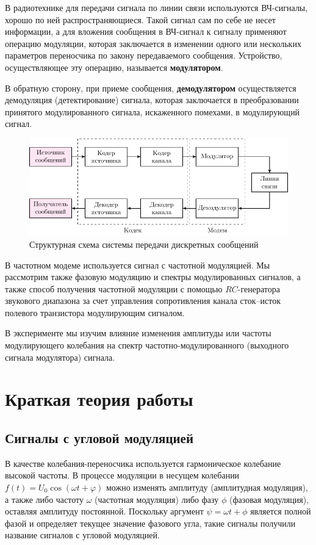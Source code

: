 В радиотехнике для передачи сигнала по линии связи используются ВЧ-сигналы, хорошо по ней распространяющиеся. Такой сигнал сам по себе не несет информации, а для вложения сообщения в ВЧ-сигнал к сигналу применяют операцию модуляции, которая заключается в изменении одного или нескольких параметров переносчика по закону передаваемого сообщения. Устройство, осуществляющее эту операцию, называется \textbf{модулятором}.

В обратную сторону, при приеме сообщения, \textbf{демодулятором} осуществляется  демодуляция (детектирование) сигнала, которая заключается в преобразовании принятого модулированного сигнала, искаженного помехами, в модулирующий сигнал. 

\begin{figure}[H]
	\centering
	\includegraphics[scale=1]{plot/struct}
	\caption{Структурная схема системы передачи дискретных сообщений}
	\label{fig:2}
\end{figure} 

В частотном модеме используется сигнал с частотной модуляцией. Мы рассмотрим также фазовую модуляцию и спектры модулированных сигналов, а также способ получения частотной модуляции с помощью $RC$-генератора звукового диапазона за счет управления сопротивления канала сток--исток полевого транзистора модулирующим сигналом. 

В эксперименте мы изучим влияние изменения амплитуды или частоты модулирующего колебания на спектр частотно-модулированного (выходного сигнала модулятора) сигнала. 

\section{Краткая теория работы}
\subsection{Сигналы с угловой модуляцией}
В качестве колебания-переносчика используется гармоническое колебание высокой частоты. В процессе модуляции в несущем колебании $f(t)=U_{0} \cos (\omega t+\varphi)$ можно изменять амплитуду (амплитудная модуляция), а также либо частоту $\omega$ (частотная модуляция) либо фазу $\phi$ (фазовая модуляция), оставляя амплитуду постоянной. Поскольку аргумент $\psi=\omega t+\phi$ является полной фазой и определяет текущее значение фазового угла, такие сигналы получили название сигналов с угловой модуляцией.

